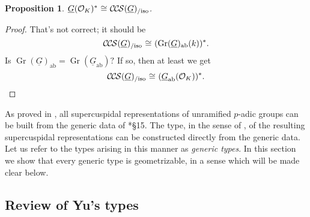 \documentclass[10pt]{amsart}
\theoremstyle{plain}
\newtheorem{proposition}[theorem]{Proposition}
\theoremstyle{definition}
\newcommand{\OK}{\mathcal{O}_K}
\newcommand{\Fq}{k}
\DeclareMathOperator{\Gr}{Gr}
\newcommand{\ab}{_{\operatorname{ab}}}
\newcommand{\iso}{{\ \cong\ }}
\newcommand{\CCS}{{\mathcal{C\hskip-.8pt C\hskip-0.8pt S}}}
\newcommand{\CCSiso}[1]{\CCS(#1)_{/\text{iso}}}
\begin{document}
\begin{proposition}\label{prop:QCS}
$\underline{G}(\OK)^* \iso \CCSiso{\underline{G}}$.
\end{proposition}

\begin{proof}
That's not correct; it should be 
\[
\CCSiso{\underline{G}} \iso (\Gr(\underline{G})\ab(\Fq))^*.
\]
Is $\Gr(\underline{G})\ab = \Gr(\underline{G}\ab)?$ If so, then at least we get 
\[
\CCSiso{\underline{G}} \iso (\underline{G}\ab(\OK))^*.
\]
\end{proof}

\fi


\newcommand{\red}{^{\operatorname{red}}}


As proved in \cite{kim:07a}, all supercuspidal representations of unramified $p$-adic groups can be built from the generic data of \cite{yu:01a}*{\S 15}.
The type, in the sense of \cite{bushnell-kutzko:98a}, of the resulting supercuspidal representations can be constructed directly from the generic data. 
Let us refer to the types arising in this manner as {\it generic types}.
In this section we show that every generic type is geometrizable, in a sense which will be made clear below.


\subsection{Review of Yu's types}
\end{document}
